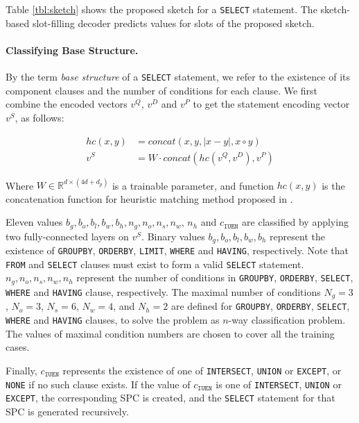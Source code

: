 \documentclass[11pt,a4paper]{article}
\begin{document}
Table \ref{tbl:sketch} shows the proposed sketch for a \texttt{SELECT} statement. The sketch-based slot-filling decoder predicts values for slots of the proposed sketch.  

\paragraph{Classifying Base Structure.}  By the term \textit{base structure} of a \texttt{SELECT} statement, we refer to the existence of its component clauses and the number of conditions for each clause. We first combine the encoded vectors $v^Q$, $v^D$ and $v^P$ to get the statement encoding vector $v^S$, as follows:

\begin{align}
hc( x, y ) &= concat( x, y, |x-y|, x \circ y) \label{eq:hc} \\
v^S &= W \cdot concat( hc( v^Q, v^D ), v^P )
\end{align}

Where $W \in \mathbb{R} ^ {d \times (4d + d_p)}$ is a trainable parameter, and function $hc(x,y)$ is the concatenation function for heuristic matching method proposed in \citet{heuristicmatching}.

Eleven values $b_g, b_o, b_l, b_w, b_h, n_g, n_o, n_s, n_w$, $n_h$ and $c_\texttt{IUEN}$ are classified by applying two fully-connected layers on $v^S$. Binary values $b_g, b_o, b_l, b_w, b_h$ represent the existence of \texttt{GROUPBY}, \texttt{ORDERBY}, \texttt{LIMIT}, \texttt{WHERE} and \texttt{HAVING}, respectively. Note that \texttt{FROM} and \texttt{SELECT} clauses must exist to form a valid \texttt{SELECT} statement. $n_g, n_o, n_s, n_w, n_h$ represent the number of conditions in \texttt{GROUPBY}, \texttt{ORDERBY}, \texttt{SELECT}, \texttt{WHERE} and \texttt{HAVING} clause, respectively. The maximal number of conditions $N_g = 3$, $N_o = 3$, $N_s=6$, $N_w=4$, and $N_h=2$ are defined for  \texttt{GROUPBY}, \texttt{ORDERBY}, \texttt{SELECT}, \texttt{WHERE} and \texttt{HAVING} clauses, to solve the problem as $n$-way classification problem. The values of maximal condition numbers are chosen to cover all the training cases.

Finally, $c_\texttt{IUEN}$ represents the existence of one of \texttt{INTERSECT}, \texttt{UNION} or \texttt{EXCEPT}, or \texttt{NONE} if no such clause exists. If the value of $c_\texttt{IUEN}$ is one of \texttt{INTERSECT}, \texttt{UNION} or \texttt{EXCEPT}, the corresponding SPC is created, and the \texttt{SELECT} statement for that SPC is generated recursively.
\end{document}
